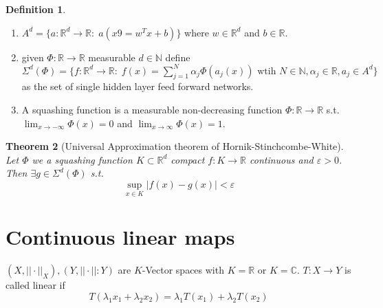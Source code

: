 \documentclass[a4paper, 12pt]{article}
\theoremstyle{plain}
\newtheorem{theorem}{Theorem}[subsection] %
\theoremstyle{definition}
\newtheorem{definition}[theorem]{Definition} %
\theoremstyle{lemma}
\theoremstyle{remark}
\theoremstyle{corollary}
\theoremstyle{example}
\begin{document}
	\begin{definition}
		\begin{enumerate}
			\item $A^d = \{a: \mathbb{R}^d \to \mathbb{R}: \; a(x9 = w^Tx+b)\}$ where $w \in \mathbb{R}^d$ and $b \in \mathbb{R}$.
			\item given $\Phi: \mathbb{R} \to \mathbb{R}$ measurable $d \in \mathbb{N}$ define $\Sigma^d(\Phi) = \{f: \mathbb{R}^d \to \mathbb{R}: \; f(x) = \sum_{j=1}^N \alpha_j \Phi(a_j(x)) \text{ wtih } N \in \mathbb{N}, \alpha_j \in \mathbb{R}, a_j \in A^d\}$ as the set of single hidden layer feed forward networks.
			\item A squashing function is a measurable non-decreasing function $\Phi: \mathbb{R} \to \mathbb{R}$ s.t. $\lim_{x \to -\infty} \Phi(x) = 0$ and $\lim_{x \to \infty} \Phi(x) = 1$.
		\end{enumerate}
	\end{definition}
	\begin{theorem}[Universal Approximation theorem of Hornik-Stinchcombe-White]
		Let $\Phi$ we a squashing function $K\subset \mathbb{R}^d$ compact $f:K \to \mathbb{R}$ continuous and $\varepsilon > 0$. Then $\exists g \in \Sigma^d(\Phi)$ s.t. \[\sup_{x \in K} \left|f(x)-g(x)\right| < \varepsilon\]
	\end{theorem}
	
	\section{Continuous linear maps}
	$(X,||\cdot ||_X), (Y,||\cdot ||:Y)$ are $K$-Vector spaces with $K = \mathbb{R}$ or $K = \mathbb{C}$. $T:X \to Y$ is called linear if \[T(\lambda_1x_1 + \lambda_2 x_2) = \lambda_1 T(x_1) + \lambda_2 T(x_2)\]
\end{document}
